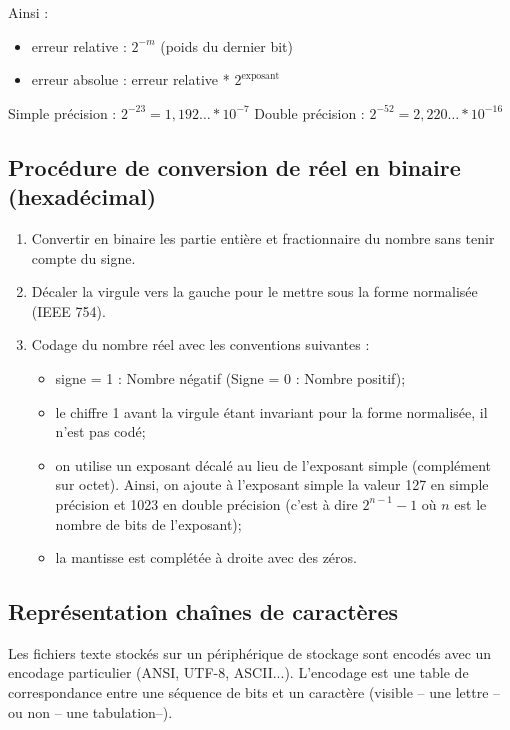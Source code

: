 \documentclass[10pt,fleqn]{article} %
\begin{document}
\vspace{.25cm}

Ainsi : 
\begin{itemize}
\item erreur relative : $2^{-m}$ (poids du dernier bit)
\item erreur absolue : erreur relative * $2^{\text{exposant}}$
\end{itemize}

Simple précision :  	$2^{- 23} = 1,192 … * 10^{- 7}$ 
Double précision :  	$2^{- 52} = 2,220 … * 10^{- 16}$


\subsection*{Procédure de conversion de réel en binaire (hexadécimal) }

\begin{methode}
\begin{enumerate}
\item Convertir en binaire les partie entière et fractionnaire du nombre sans tenir compte du signe.
\item Décaler la virgule vers la gauche pour le mettre sous la forme normalisée (IEEE 754).
\item Codage du nombre réel avec les conventions suivantes : 
\begin{itemize}
\item signe = 1 : Nombre négatif 	(Signe = 0 : Nombre positif);
\item le chiffre 1 avant la virgule étant invariant pour la forme normalisée, il n’est pas codé;
\item on utilise un exposant décalé au lieu de l’exposant simple (complément sur octet). Ainsi, on ajoute à l’exposant simple la valeur 127 en simple précision et 1023 en double précision (c’est à dire $2^{n-1}-1$ où $n$ est le nombre de bits de l’exposant);
\item la mantisse est complétée à droite avec des zéros.
\end{itemize}
\end{enumerate}
\end{methode}

\subsection*{Représentation chaînes de caractères}
Les fichiers texte stockés sur un périphérique de stockage sont encodés avec un encodage particulier (ANSI, UTF-8, ASCII...). L'encodage est une table de correspondance entre une séquence de bits et un caractère (visible -- une lettre -- ou non -- une tabulation--).
\end{document}
